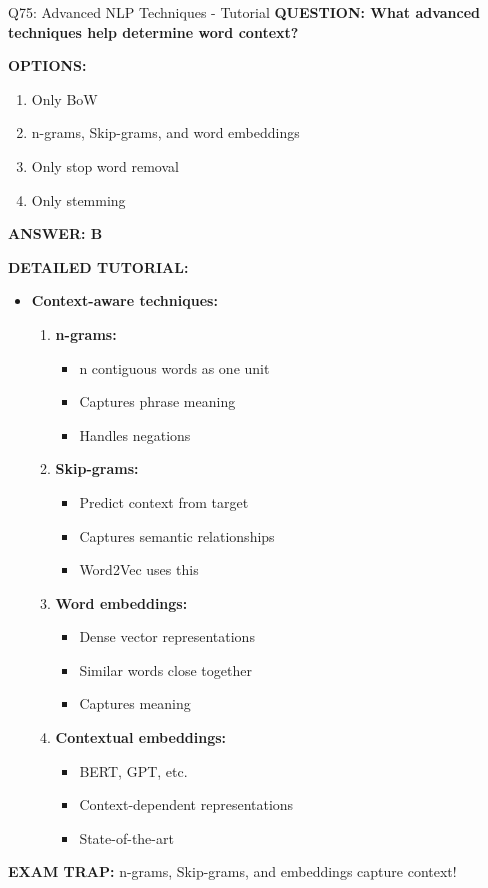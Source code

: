 \documentclass[8pt]{beamer}
\begin{document}
	\begin{frame}{Q75: Advanced NLP Techniques - Tutorial}
		\fontsize{6.5}{7.5}\selectfont
		\textbf{QUESTION: What advanced techniques help determine word context?}
		
		\vspace{0.1cm}
		\textbf{OPTIONS:}
		\begin{enumerate}
			\item Only BoW
			\item n-grams, Skip-grams, and word embeddings
			\item Only stop word removal
			\item Only stemming
		\end{enumerate}
		
		\vspace{0.1cm}
		\textcolor{myblue}{\textbf{ANSWER: B}}
		
		\vspace{0.1cm}
		\textbf{DETAILED TUTORIAL:}
		\begin{itemize}
			\item \textbf{Context-aware techniques:}
			\begin{enumerate}
				\item \textbf{n-grams:}
				\begin{itemize}
					\item n contiguous words as one unit
					\item Captures phrase meaning
					\item Handles negations
				\end{itemize}
				\item \textbf{Skip-grams:}
				\begin{itemize}
					\item Predict context from target
					\item Captures semantic relationships
					\item Word2Vec uses this
				\end{itemize}
				\item \textbf{Word embeddings:}
				\begin{itemize}
					\item Dense vector representations
					\item Similar words close together
					\item Captures meaning
				\end{itemize}
				\item \textbf{Contextual embeddings:}
				\begin{itemize}
					\item BERT, GPT, etc.
					\item Context-dependent representations
					\item State-of-the-art
				\end{itemize}
			\end{enumerate}
		\end{itemize}
		
		\textcolor{myred}{\textbf{EXAM TRAP:}} \textcolor{myblue}{n-grams, Skip-grams, and embeddings} capture context!
	\end{frame}
	
\end{document}
